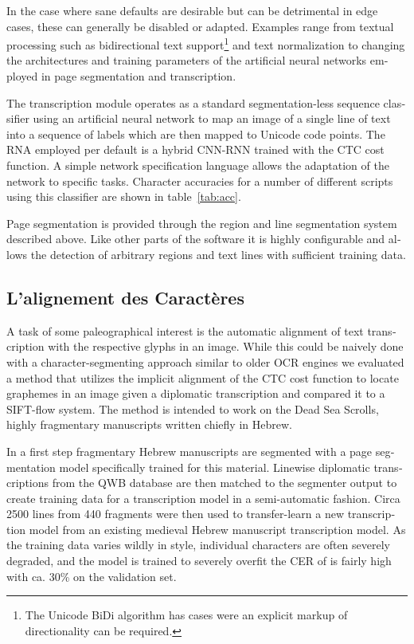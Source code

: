 \begin{french}
In the case where sane defaults are desirable but can be detrimental in edge
cases, these can generally be disabled or adapted. Examples range from textual
processing such as bidirectional text support\footnote{The Unicode BiDi
algorithm has cases were an explicit markup of directionality can be required.}
and text normalization to changing the architectures and training parameters of
the artificial neural networks employed in page segmentation and transcription.

The transcription module operates as a standard segmentation-less sequence
classifier using an artificial neural network to map an image of a single line
of text into a sequence of labels which are then mapped to Unicode code points.
The RNA employed per default is a hybrid CNN-RNN trained with the CTC cost
function. A simple network specification language allows the adaptation of the
network to specific tasks. Character accuracies for a number of different
scripts using this classifier are shown in table~\ref{tab:acc}.

Page segmentation is provided through the region and line segmentation system
described above. Like other parts of the software it is highly configurable and
allows the detection of arbitrary regions and text lines with sufficient
training data.

\subsection{L'alignement des Caractères}

A task of some paleographical interest is the automatic alignment of text
transcription with the respective glyphs in an image. While this could be
naively done with a character-segmenting approach similar to older OCR engines
we evaluated a method that utilizes the implicit alignment of the CTC cost
function to locate graphemes in an image given a diplomatic transcription and
compared it to a SIFT-flow system. The method is intended to work on the Dead
Sea Scrolls, highly fragmentary manuscripts written chiefly in Hebrew.

In a first step fragmentary Hebrew manuscripts are segmented with a page
segmentation model specifically trained for this material. Linewise diplomatic
transcriptions from the QWB database are then matched to the segmenter output
to create training data for a transcription model in a semi-automatic fashion.
Circa 2500 lines from 440 fragments were then used to transfer-learn a new
transcription model from an existing medieval Hebrew manuscript transcription
model. As the training data varies wildly in style, individual characters are
often severely degraded, and the model is trained to severely overfit the CER
of is fairly high with ca. 30\% on the validation set.


\end{french}
